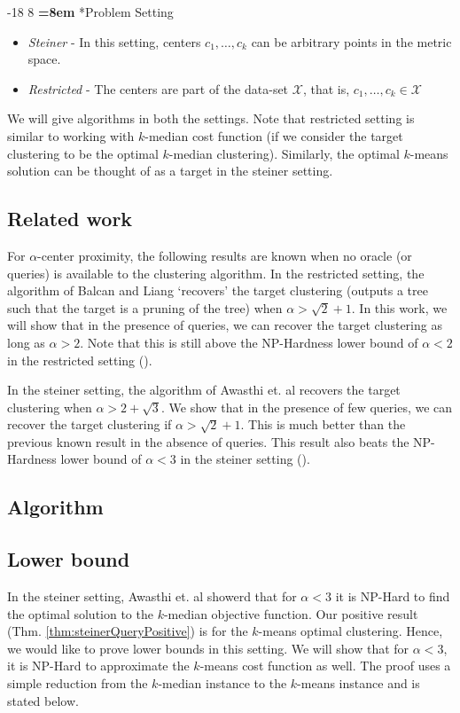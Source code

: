 \documentclass[orivec]{llncs}
\makeatletter
\newcommand{\mc}{\mathcal}
\renewcommand\subsubsection{\@startsection{subsubsection}{3}{\z@}%
   {-18\p@ \@plus -4\p@ \@minus -4\p@}%
   {8\p@ \@plus 4\p@ \@minus 4\p@}%
   {\normalfont\normalsize\bfseries\boldmath
   \rightskip=\z@ \@plus 8em \pretolerance=10000}}
\makeatother
\begin{document}
\subsubsection*{Problem Setting}
\begin{itemize}[nolistsep, noitemsep]
\item {\it Steiner} - In this setting, centers $c_1, \ldots, c_k$ can be arbitrary points in the metric space.
\item {\it Restricted} - The centers are part of the data-set $\mc X$, that is, $c_1, \ldots, c_k \in \mc X$ \\
\end{itemize}
We will give algorithms in both the settings. Note that restricted setting is similar to working with $k$-median cost function (if we consider the target clustering to be the optimal $k$-median clustering). Similarly, the optimal $k$-means solution can be thought of as a target in the steiner setting.

\subsection{Related work}
\label{section:relatedwork}
For $\alpha$-center proximity, the following results are known when no oracle (or queries) is available to the clustering algorithm. In the restricted setting, the algorithm of Balcan and Liang \cite{balcan2012clustering} `recovers' the target clustering (outputs a tree such that the target is a pruning of the tree) when $\alpha > \sqrt{2} + 1$. In this work, we will show that in the presence of queries, we can recover the target clustering as long as $\alpha > 2$. Note that this is still above the NP-Hardness lower bound of $\alpha < 2$ in the restricted setting (\cite{ben2014data}).

In the steiner setting, the algorithm of Awasthi et. al \cite{awasthi2012center} recovers the target clustering when $\alpha > 2+\sqrt{3}$. We show that in the presence of few queries, we can recover the target clustering if $\alpha > \sqrt{2}+1$. This is much better than the previous known result in the absence of queries. This result also beats the NP-Hardness lower bound of $\alpha < 3$ in the steiner setting (\cite{awasthi2012center}).

\subsection{Algorithm}


\subsection{Lower bound}
In the steiner setting, Awasthi et. al \cite{awasthi2012center} showerd that for $\alpha < 3$ it is NP-Hard to find the optimal solution to the $k$-median objective function. Our positive result (Thm. \ref{thm:steinerQueryPositive}) is for the $k$-means optimal clustering. Hence, we would like to prove lower bounds in this setting. We will show that for $\alpha < 3$, it is NP-Hard to approximate the $k$-means cost function as well. The proof uses a simple reduction from the $k$-median instance to the $k$-means instance and is stated below.
\end{document}
